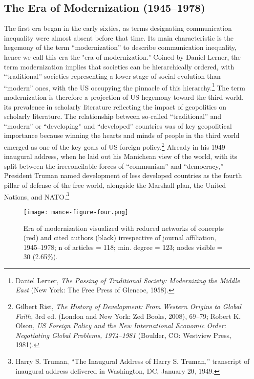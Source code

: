 \documentclass{tufte-handout}
\begin{document}
\hypertarget{the-era-of-modernization-19451978}{%
\subsection{The Era of Modernization
(1945--1978)}\label{the-era-of-modernization-19451978}}

The first era began in the early sixties, as terms designating
communication inequality were almost absent before that time. Its main
characteristic is the hegemony of the term ``modernization'' to describe
communication inequality, hence we call this era the "era of
modernization." Coined by Daniel Lerner, the term modernization implies
that societies can be hierarchically ordered, with ``traditional''
societies representing a lower stage of social evolution than ``modern''
ones, with the US occupying the pinnacle of this hierarchy.\footnote{Daniel
  Lerner, \emph{The Passing of Traditional Society: Modernizing the
  Middle East} (New York: The Free Press of Glencoe, 1958).} The term
modernization is therefore a projection of US hegemony toward the third
world, its prevalence in scholarly literature reflecting the impact of
geopolitics on scholarly literature. The relationship between so-called
``traditional'' and ``modern'' or ``developing'' and ``developed''
countries was of key geopolitical importance because winning the hearts
and minds of people in the third world emerged as one of the key goals
of US foreign policy.\footnote{Gilbert Rist, \emph{The History of
  Development: From Western Origins to Global Faith,} 3rd ed. (London
  and New York: Zed Books, 2008), 69--79; Robert K. Olson, \emph{US
  Foreign Policy and the New International Economic Order: Negotiating
  Global Problems, 1974--1981} (Boulder, CO: Westview Press, 1981).}
Already in his 1949 inaugural address, when he laid out his Manichean
view of the world, with its split between the irreconcilable forces of
``communism'' and ``democracy,'' President Truman named development of
less developed countries as the fourth pillar of defense of the free
world, alongside the Marshall plan, the United Nations, and
NATO.\footnote{Harry S. Truman, ``The Inaugural Address of Harry S.
  Truman,'' transcript of inaugural address delivered in Washington, DC,
  January 20, 1949.}
  
\begin{figure}
    \centering
    \texttt{[image: mance-figure-four.png]}
    \caption{Era of modernization visualized with reduced networks of
concepts (red) and cited authors (black) irrespective of journal
affiliation, 1945--1978; n of articles = 118; min. degree = 123; nodes
visible = 30 (2.65\%).}
    \label{fig:four}
\end{figure}
\end{document}
